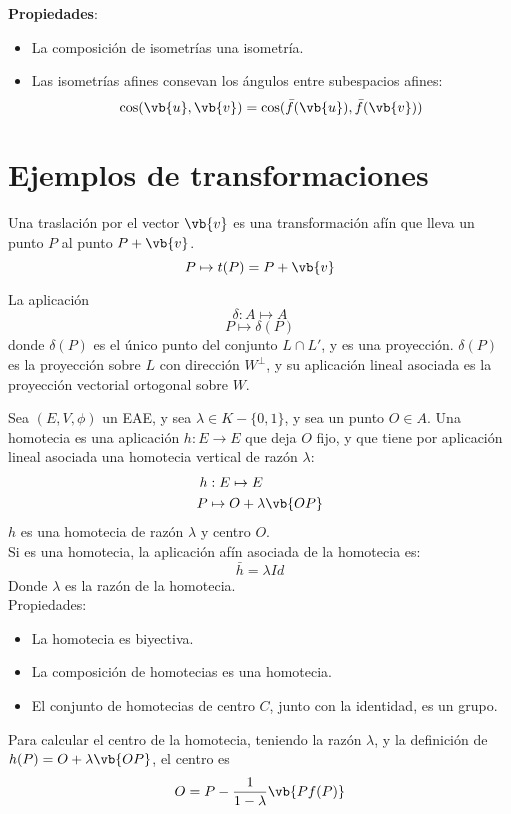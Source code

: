 \documentclass{./Geometria.tex}
\begin{document}
\textbf{Propiedades}:
\begin{itemize}
	\item La composición de isometrías una isometría.
	\item Las isometrías afines consevan los ángulos entre subespacios afines:
		\[
			\cos (\vb{u}, \vb{v}) = \cos (\bar{f}(\vb{u}), \bar{f}(\vb{v}))
		\]
\end{itemize}
\section{Ejemplos de transformaciones}
\begin{defin}
Una traslación por el vector $\vb{v}$ es una transformación afín que lleva un punto $P$ al punto $P + \vb{v}$.
\[
	P \mapsto t(P) = P+\vb{v}
\]
\end{defin}
\begin{defin}
La aplicación
\[
	\delta:A \mapsto A
\]
\[
	P \mapsto \delta(P)
\]
donde $\delta(P)$ es el único punto del conjunto $L \cap L'$, y es una proyección. $\delta(P)$ es la proyección sobre $L$ con dirección $W^{\perp}$, y su aplicación lineal asociada es la proyección vectorial ortogonal sobre $W$.
\end{defin}
\pagebreak
\begin{defin}[Homotecia]
Sea $(E, V, \phi)$ un EAE, y sea $\lambda \in K - \{ 0,1 \}$, y sea un punto $O \in A$. Una homotecia es una aplicación $h: E \to E$ que deja $O$ fijo, y que tiene por aplicación lineal asociada una homotecia vertical de razón $\lambda$:
\begin{equation}
	\begin{split}
		h&: E \mapsto E\\
		P &\mapsto O + \lambda \vb{OP}
	\end{split}
\end{equation}
$h$ es una homotecia de razón $\lambda$ y centro $O$.\\
Si es una homotecia, la aplicación afín asociada de la homotecia es:
\[
	\bar{h} = \lambda Id
\]
Donde $\lambda$ es la razón de la homotecia.\\
Propiedades:
\begin{itemize}
	\item La homotecia es biyectiva.
	\item La composición de homotecias es una homotecia.
	\item El conjunto de homotecias de centro $C$, junto con la identidad, es un grupo.
\end{itemize}
\end{defin}
Para calcular el centro de la homotecia, teniendo la razón $\lambda$, y la definición de $h(P) = O + \lambda \vb{OP}$, el centro es
\[
	O = P- \frac{1}{1-\lambda} \vb{P f(P)}
\]
\end{document}
